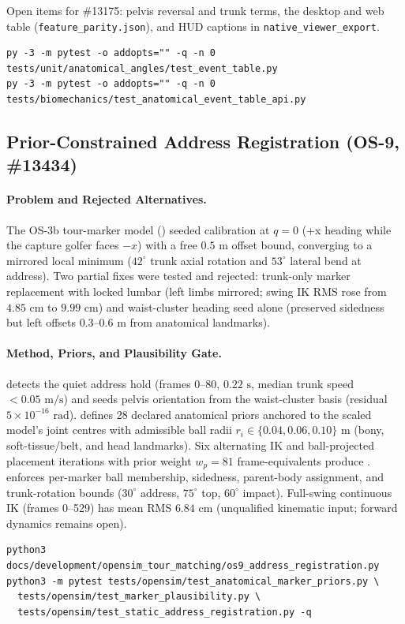 \documentclass[11pt,a4paper]{article}
\begin{document}
Open items for \#13175: pelvis reversal and trunk terms, the desktop and
web table (\texttt{feature\_parity.json}), and HUD captions in
\texttt{native\_viewer\_export}.
{\small
\begin{verbatim}
py -3 -m pytest -o addopts="" -q -n 0 tests/unit/anatomical_angles/test_event_table.py
py -3 -m pytest -o addopts="" -q -n 0 tests/biomechanics/test_anatomical_event_table_api.py
\end{verbatim}}

\subsection{Prior-Constrained Address Registration (OS-9, \#13434)}
\paragraph{Problem and Rejected Alternatives.}
The OS-3b tour-marker model ()
seeded calibration at $q = 0$ (+x heading while the capture golfer faces $-x$)
with a free $0.5\text{ m}$ offset bound, converging to a mirrored local minimum
($42^\circ$ trunk axial rotation and $53^\circ$ lateral bend at address).
Two partial fixes were tested and rejected: trunk-only marker replacement with
locked lumbar (left limbs mirrored; swing IK RMS rose from $4.85\text{ cm}$ to
$9.99\text{ cm}$) and waist-cluster heading seed alone (preserved sidedness but
left offsets $0.3\text{--}0.6\text{ m}$ from anatomical landmarks).

\paragraph{Method, Priors, and Plausibility Gate.}
 detects the quiet address
hold (frames 0--80, $0.22\text{ s}$, median trunk speed $< 0.05\text{ m/s}$)
and seeds pelvis orientation from the waist-cluster basis (residual
$5 \times 10^{-16}\text{ rad}$).  
defines 28 declared anatomical priors anchored to the scaled model's joint
centres with admissible ball radii $r_i \in \{0.04, 0.06, 0.10\}\text{ m}$
(bony, soft-tissue/belt, and head landmarks).  Six alternating IK and
ball-projected placement iterations with prior weight $w_p = 81$ frame-equivalents
produce .
 enforces per-marker ball membership,
sidedness, parent-body assignment, and trunk-rotation bounds ($30^\circ$ address,
$75^\circ$ top, $60^\circ$ impact).  Full-swing continuous IK (frames 0--529)
has mean RMS $6.84\text{ cm}$ (unqualified kinematic input; forward dynamics
remains open).
{\small
\begin{verbatim}
python3 docs/development/opensim_tour_matching/os9_address_registration.py
python3 -m pytest tests/opensim/test_anatomical_marker_priors.py \
  tests/opensim/test_marker_plausibility.py \
  tests/opensim/test_static_address_registration.py -q
\end{verbatim}}
\end{document}

